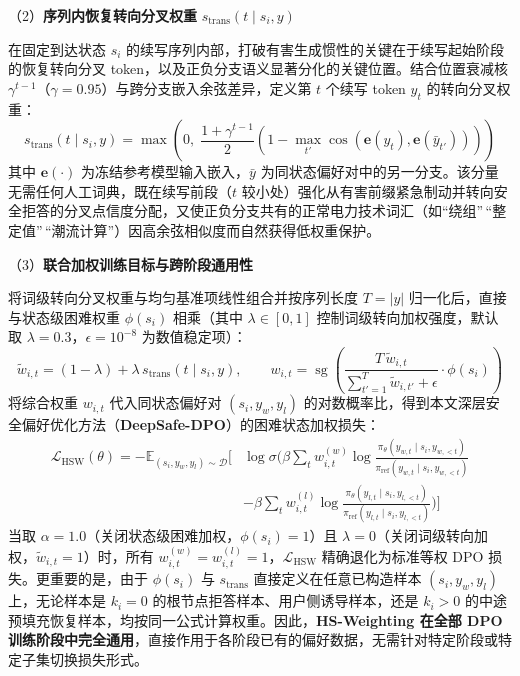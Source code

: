 \documentclass[fontset=fandol,type=master,campus=shenzhen,etitleauto=true]{hithesisbook}
\begin{document}
\noindent （2）\textbf{序列内恢复转向分叉权重} $s_{\text{trans}}(t \mid s_i, y)$

在固定到达状态 $s_i$ 的续写序列内部，打破有害生成惯性的关键在于续写起始阶段的恢复转向分叉 token，以及正负分支语义显著分化的关键位置。结合位置衰减核 $\gamma^{t-1}$（$\gamma = 0.95$）与跨分支嵌入余弦差异，定义第 $t$ 个续写 token $y_t$ 的转向分叉权重：
\begin{equation}
s_{\text{trans}}(t \mid s_i, y) = \max\left(0,\; \frac{1 + \gamma^{t-1}}{2}\left(1 - \max_{t'}\cos(\mathbf{e}(y_t),\mathbf{e}(\bar{y}_{t'}))\right)\right)
\end{equation}
其中 $\mathbf{e}(\cdot)$ 为冻结参考模型输入嵌入，$\bar{y}$ 为同状态偏好对中的另一分支。该分量无需任何人工词典，既在续写前段（$t$ 较小处）强化从有害前缀紧急制动并转向安全拒答的分叉点信度分配，又使正负分支共有的正常电力技术词汇（如``绕组''\,``整定值''\,``潮流计算''）因高余弦相似度而自然获得低权重保护。

\noindent （3）\textbf{联合加权训练目标与跨阶段通用性}

将词级转向分叉权重与均匀基准项线性组合并按序列长度 $T = |y|$ 归一化后，直接与状态级困难权重 $\phi(s_i)$ 相乘（其中 $\lambda \in [0, 1]$ 控制词级转向加权强度，默认取 $\lambda = 0.3$，$\epsilon = 10^{-8}$ 为数值稳定项）：
\begin{equation}
\tilde{w}_{i,t} = (1 - \lambda) + \lambda\, s_{\text{trans}}(t \mid s_i, y),\qquad
w_{i,t} = \operatorname{sg}\!\left(\frac{T\,\tilde{w}_{i,t}}{\sum_{t'=1}^{T}\tilde{w}_{i,t'} + \epsilon} \cdot \phi(s_i)\right)
\end{equation}
将综合权重 $w_{i,t}$ 代入同状态偏好对 $(s_i, y_w, y_l)$ 的对数概率比，得到本文深层安全偏好优化方法（\textbf{DeepSafe-DPO}）的困难状态加权损失：
\begin{equation}
\begin{aligned}
\mathcal{L}_{\text{HSW}}(\theta) = -\mathbb{E}_{(s_i,y_w,y_l)\sim\mathcal{D}}\Bigg[
&\log\sigma\Bigg(\beta\sum_{t}w_{i,t}^{(w)}\log\frac{\pi_\theta(y_{w,t}\mid s_i,y_{w,<t})}{\pi_{\text{ref}}(y_{w,t}\mid s_i,y_{w,<t})} \\
&-\beta\sum_{t}w_{i,t}^{(l)}\log\frac{\pi_\theta(y_{l,t}\mid s_i,y_{l,<t})}{\pi_{\text{ref}}(y_{l,t}\mid s_i,y_{l,<t})}\Bigg)\Bigg]
\end{aligned}
\end{equation}
当取 $\alpha = 1.0$（关闭状态级困难加权，$\phi(s_i)=1$）且 $\lambda = 0$（关闭词级转向加权，$\tilde{w}_{i,t}=1$）时，所有 $w_{i,t}^{(w)}=w_{i,t}^{(l)}=1$，$\mathcal{L}_{\text{HSW}}$ 精确退化为标准等权 DPO 损失。更重要的是，由于 $\phi(s_i)$ 与 $s_{\text{trans}}$ 直接定义在任意已构造样本 $(s_i, y_w, y_l)$ 上，无论样本是 $k_i=0$ 的根节点拒答样本、用户侧诱导样本，还是 $k_i>0$ 的中途预填充恢复样本，均按同一公式计算权重。因此，\textbf{HS-Weighting 在全部 DPO 训练阶段中完全通用}，直接作用于各阶段已有的偏好数据，无需针对特定阶段或特定子集切换损失形式。
\end{document}
